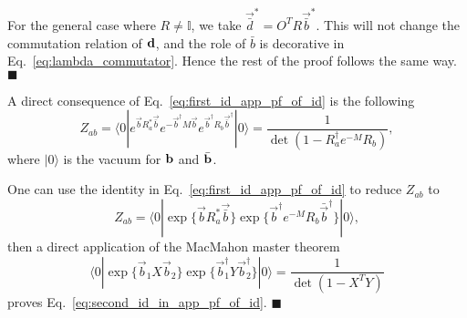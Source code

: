 For the general case where $R \neq\mathbb{I}$, we take $\vec{\bar{d}}^* = O^T R \vec{\bar{b}}^*$. This will not change the commutation relation of ${\bf d}$, and the role of $\bar{b}$ is decorative in Eq.~\eqref{eq:lambda_commutator}. Hence the rest of the proof follows the same way. \hfill$\blacksquare$

A direct consequence of Eq.~\eqref{eq:first_id_app_pf_of_id} is the following
\begin{equation}
\label{eq:second_id_in_app_pf_of_id}
Z_{ab} = \langle 0 | e^{ \vec{b} R_a^* \vec{\bar{b}} } e^{ - \vec{b}^{\dagger} M  \vec{b} } e^{  \vec{b}^{\dagger} R_b  \vec{\bar{b}}^{\dagger} }  |0  \rangle  = \frac{1}{\det( 1- R_a^{\dagger} e^{-M} R_b )} ,
\end{equation}
where $|0\rangle$ is the vacuum for ${\bf b}$ and $\bar{\bf b}$. 

One can use the identity in Eq.~\eqref{eq:first_id_app_pf_of_id} to reduce $Z_{ab}$ to 
\begin{equation}
Z_{ab} =   \langle 0 | \exp\Big\{ \vec{b} R_a^* \vec{\bar{b}}\Big\}  \exp \Big\{ \vec{b}^{\dagger} e^{-M}  R_b \bar{\vec{b}}^{\dagger}  \Big\}  |0 \rangle, 
\end{equation}
then a direct application of the MacMahon master theorem
\begin{equation}
  \langle 0 | \exp \Big\{ \vec{b}_1 X \vec{b}_2 \Big\}  \exp \Big\{ \vec{b}^{\dagger}_1 Y \vec{b}^{\dagger}_2 \Big\}|0  \rangle 
 = \frac{1}{\det(1 - X^T Y )}
\end{equation}
proves Eq.~\eqref{eq:second_id_in_app_pf_of_id}. \hfill$\blacksquare$



